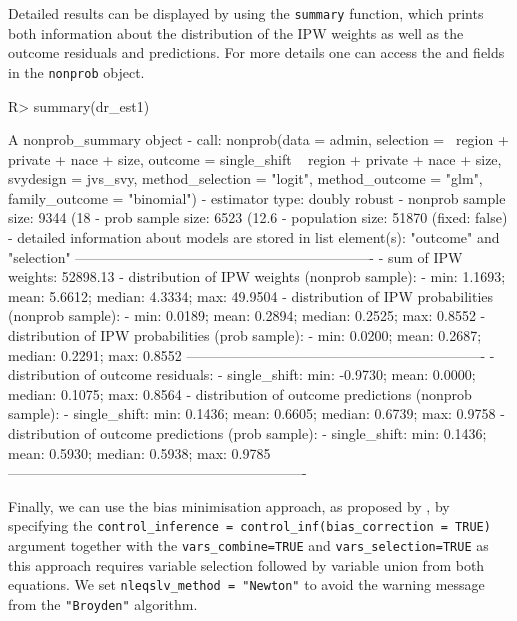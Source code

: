 \documentclass[
]{jss}
\begin{document}
Detailed results can be displayed by using the \texttt{summary}
function, which prints both information about the distribution of the
IPW weights as well as the outcome residuals and predictions. For more
details one can access the  and 
fields in the \texttt{nonprob} object.

\begin{CodeChunk}
\begin{CodeInput}
R> summary(dr_est1)
\end{CodeInput}
\begin{CodeOutput}
A nonprob_summary object
 - call: nonprob(data = admin, selection = ~region + private + nace + 
    size, outcome = single_shift ~ region + private + nace + 
    size, svydesign = jvs_svy, method_selection = "logit", method_outcome = "glm", 
    family_outcome = "binomial")
 - estimator type: doubly robust
 - nonprob sample size: 9344 (18%
 - prob sample size: 6523 (12.6%
 - population size: 51870 (fixed: false)
 - detailed information about models are stored in list element(s): "outcome" and "selection"
----------------------------------------------------------------
 - sum of IPW weights: 52898.13 
 - distribution of IPW weights (nonprob sample):
   - min: 1.1693; mean: 5.6612; median: 4.3334; max: 49.9504
 - distribution of IPW probabilities (nonprob sample):
   - min: 0.0189; mean: 0.2894; median: 0.2525; max: 0.8552
 - distribution of IPW probabilities (prob sample):
   - min: 0.0200; mean: 0.2687; median: 0.2291; max: 0.8552
----------------------------------------------------------------
 - distribution of outcome residuals:
   - single_shift: min: -0.9730; mean: 0.0000; median: 0.1075; max: 0.8564
 - distribution of outcome predictions (nonprob sample):
   - single_shift: min: 0.1436; mean: 0.6605; median: 0.6739; max: 0.9758
 - distribution of outcome predictions (prob sample):
   - single_shift: min: 0.1436; mean: 0.5930; median: 0.5938; max: 0.9785
----------------------------------------------------------------
\end{CodeOutput}
\end{CodeChunk}

Finally, we can use the bias minimisation approach, as proposed by
\citet{yang_doubly_2020}, by specifying the
\texttt{control\_inference\ =\ control\_inf(bias\_correction\ =\ TRUE)}
argument together with the \texttt{vars\_combine=TRUE} and
\texttt{vars\_selection=TRUE} as this approach requires variable
selection followed by variable union from both equations. We set
\texttt{nleqslv\_method\ =\ "Newton"} to avoid the warning message from
the \texttt{"Broyden"} algorithm.
\end{document}
